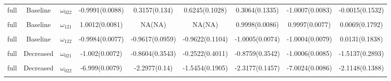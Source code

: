 \documentclass[
]{article}
\begin{document}
\begin{landscape}
\begin{longtable}{ccccccccc}
full & Baseline & $\omega_{022}$ & -0.9991(0.0088) & 0.3157(0.134) & 0.6245(0.1028) & 0.3064(0.1335) & -1.0007(0.0083) & -0.0015(0.1532)\\
\addlinespace
\cellcolor{gray!15}{full} & \cellcolor{gray!15}{Baseline} & \cellcolor{gray!15}{$\omega_{111}$} & \cellcolor{gray!15}{-2.9985(0.0079)} & \cellcolor{gray!15}{-2.468(0.1851)} & \cellcolor{gray!15}{-2.613(0.1697)} & \cellcolor{gray!15}{-3.0002(0.0074)} & \cellcolor{gray!15}{-3.0009(0.0082)} & \cellcolor{gray!15}{-0.36(0.2698)}\\
full & Baseline & $\omega_{121}$ & 1.0012(0.0081) & NA(NA) & NA(NA) & 0.9998(0.0086) & 0.9997(0.0077) & 0.0069(0.1792)\\
\cellcolor{gray!15}{full} & \cellcolor{gray!15}{Baseline} & \cellcolor{gray!15}{$\omega_{112}$} & \cellcolor{gray!15}{1.0016(0.008)} & \cellcolor{gray!15}{NA(NA)} & \cellcolor{gray!15}{NA(NA)} & \cellcolor{gray!15}{1.0006(0.008)} & \cellcolor{gray!15}{1.0015(0.0076)} & \cellcolor{gray!15}{-0.1365(0.2745)}\\
full & Baseline & $\omega_{122}$ & -0.9984(0.0077) & -0.9617(0.0959) & -0.9622(0.1104) & -1.0005(0.0074) & -1.0004(0.0079) & 0.0131(0.1838)\\
\cellcolor{gray!15}{full} & \cellcolor{gray!15}{Decreased} & \cellcolor{gray!15}{$\omega_{011}$} & \cellcolor{gray!15}{-8.0006(0.0078)} & \cellcolor{gray!15}{-3.8273(0.1177)} & \cellcolor{gray!15}{-2.5454(0.1905)} & \cellcolor{gray!15}{-3.8677(0.1545)} & \cellcolor{gray!15}{-8.0003(0.0085)} & \cellcolor{gray!15}{-3.2998(0.1149)}\\
\addlinespace
full & Decreased & $\omega_{021}$ & -1.002(0.0072) & -0.8604(0.3543) & -0.2522(0.4011) & -0.8759(0.3542) & -1.0006(0.0085) & -1.5137(0.2893)\\
\cellcolor{gray!15}{full} & \cellcolor{gray!15}{Decreased} & \cellcolor{gray!15}{$\omega_{012}$} & \cellcolor{gray!15}{-0.4993(0.0083)} & \cellcolor{gray!15}{0.4697(0.2179)} & \cellcolor{gray!15}{1.6485(0.2733)} & \cellcolor{gray!15}{0.4329(0.2447)} & \cellcolor{gray!15}{-0.5004(0.0077)} & \cellcolor{gray!15}{-1.3927(0.2446)}\\
full & Decreased & $\omega_{022}$ & -6.999(0.0079) & -2.2977(0.14) & -1.5454(0.1905) & -2.3177(0.1457) & -7.0024(0.0086) & -2.1148(0.1388)\\
\cellcolor{gray!15}{full} & \cellcolor{gray!15}{Decreased} & \cellcolor{gray!15}{$\omega_{111}$} & \cellcolor{gray!15}{-2.9992(0.0081)} & \cellcolor{gray!15}{-2.8562(0.1734)} & \cellcolor{gray!15}{-2.5179(0.4431)} & \cellcolor{gray!15}{-2.9999(0.0085)} & \cellcolor{gray!15}{-3(0.0081)} & \cellcolor{gray!15}{-2.0628(0.2436)}\\

\end{longtable}
\end{landscape}
\end{document}
